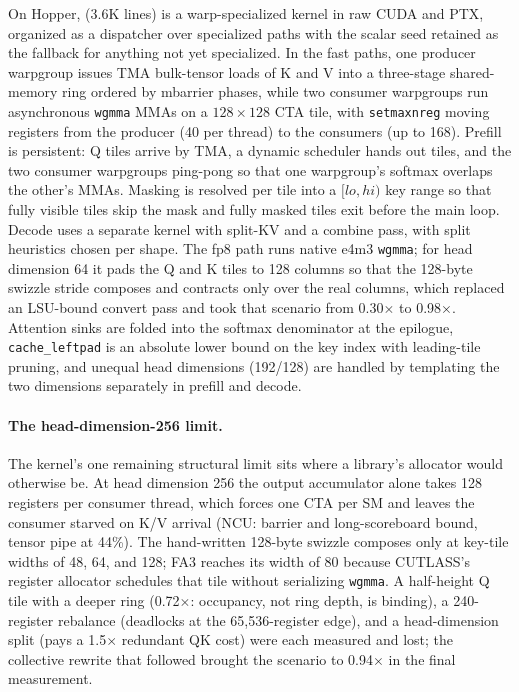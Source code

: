 On Hopper, \ksFaThree (3.6K lines) is a warp-specialized kernel in raw CUDA and PTX, organized as a
dispatcher over specialized paths with the scalar seed retained as the fallback for anything not
yet specialized. In the fast paths, one producer warpgroup issues TMA bulk-tensor loads of K and V
into a three-stage shared-memory ring ordered by mbarrier phases, while two consumer warpgroups run
asynchronous \texttt{wgmma} MMAs on a $128\times128$ CTA tile, with \texttt{setmaxnreg} moving
registers from the producer (40 per thread) to the consumers (up to 168). Prefill is persistent: Q
tiles arrive by TMA, a dynamic scheduler hands out tiles, and the two consumer warpgroups ping-pong so
that one warpgroup's softmax overlaps the other's MMAs. Masking is resolved per tile into a $[lo,hi)$
key range so that fully visible tiles skip the mask and fully masked tiles exit before the main loop.
Decode uses a separate kernel with split-KV and a combine pass, with split heuristics chosen per
shape. The fp8 path runs native e4m3 \texttt{wgmma}; for head dimension 64 it pads the Q and K tiles
to 128 columns so that the 128-byte swizzle stride composes and contracts only over the real columns,
which replaced an LSU-bound convert pass and took that scenario from 0.30$\times$ to 0.98$\times$.
Attention sinks are folded into the softmax denominator at the epilogue, \texttt{cache\_leftpad} is an
absolute lower bound on the key index with leading-tile pruning, and unequal head dimensions
(192/128) are handled by templating the two dimensions separately in prefill and decode.

\paragraph{The head-dimension-256 limit.} The kernel's one remaining structural limit sits where a
library's allocator would otherwise be. At head dimension 256 the output accumulator alone takes 128
registers per consumer thread, which forces one CTA per SM and leaves the consumer starved on K/V
arrival (NCU: barrier and long-scoreboard bound, tensor pipe at 44\%). The hand-written 128-byte
swizzle composes only at key-tile widths of 48, 64, and 128; FA3 reaches its width of 80 because
CUTLASS's register allocator schedules that tile without serializing \texttt{wgmma}. A half-height Q
tile with a deeper ring (0.72$\times$: occupancy, not ring depth, is binding), a 240-register
rebalance (deadlocks at the 65,536-register edge), and a head-dimension split (pays a 1.5$\times$
redundant QK cost) were each measured and lost; the collective rewrite that followed brought the
scenario to 0.94$\times$ in the final measurement.

